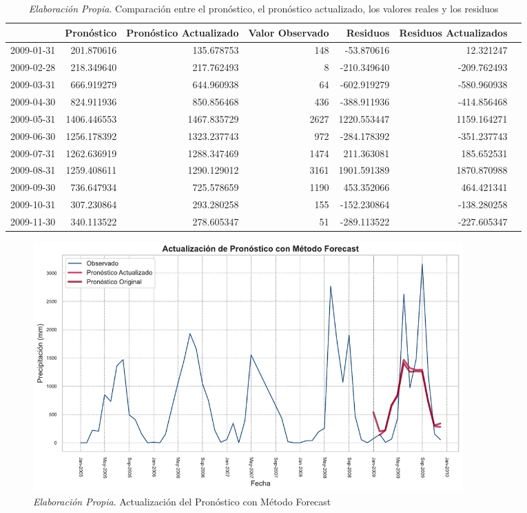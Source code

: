 \documentclass[12pt,letterpaper]{article}   %
\begin{document}
\begin{table}[ht]
\tiny
\centering
\begin{tabular}{lrrrrrr}
\toprule
 & \textbf{Pronóstico} & \textbf{Pronóstico Actualizado} & \textbf{Valor Observado} & \textbf{Residuos} & \textbf{Residuos Actualizados} \\
\midrule
2009-01-31 & 201.870616 & 135.678753 & 148 & -53.870616 & 12.321247 \\
2009-02-28 & 218.349640 & 217.762493 & 8 & -210.349640 & -209.762493 \\
2009-03-31 & 666.919279 & 644.960938 & 64 & -602.919279 & -580.960938 \\
2009-04-30 & 824.911936 & 850.856468 & 436 & -388.911936 & -414.856468 \\
2009-05-31 & 1406.446553 & 1467.835729 & 2627 & 1220.553447 & 1159.164271 \\
2009-06-30 & 1256.178392 & 1323.237743 & 972 & -284.178392 & -351.237743 \\
2009-07-31 & 1262.636919 & 1288.347469 & 1474 & 211.363081 & 185.652531 \\
2009-08-31 & 1259.408611 & 1290.129012 & 3161 & 1901.591389 & 1870.870988 \\
2009-09-30 & 736.647934 & 725.578659 & 1190 & 453.352066 & 464.421341 \\
2009-10-31 & 307.230864 & 293.280258 & 155 & -152.230864 & -138.280258 \\
2009-11-30 & 340.113522 & 278.605347 & 51 & -289.113522 & -227.605347 \\
\bottomrule
\end{tabular}
\caption{\textit{Elaboración Propia}. Comparación entre el pronóstico, el pronóstico actualizado, los valores reales y los residuos}
\end{table}



\begin{figure}[ht]
    \centering
    \includegraphics[width=0.8\textwidth]{imagenes/06-01-Actualizacion-de-pronostico-metodo-forecast.pdf}
    \caption{\textit{Elaboración Propia}. Actualización del Pronóstico con Método Forecast}
\end{figure}
\end{document}
